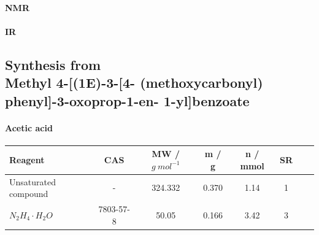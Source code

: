 \documentclass[../Master.tex]{subfiles}
\begin{document}
\paragraph{NMR}

\paragraph{IR}

\subsection{Synthesis from \\Methyl 4-[(1E)-3-[4- (methoxycarbonyl) phenyl]-3-oxoprop-1-en-
1-yl]benzoate}

\paragraph{Acetic acid}

\begin{center}
	\begin{tabular}[b]{lccccccc}
		\toprule
		Reagent               & CAS       & MW / \(g \ mol^{-1}\) & m / g & n / mmol & SR \\
		\midrule
		Unsaturated compound  & -         & 324.332               & 0.370 & 1.14     & 1  \\
		\(N_2H_4 \cdot H_2O\) & 7803-57-8 & 50.05                 & 0.166 & 3.42     & 3  \\
		\bottomrule
	\end{tabular}
\end{center}

\end{document}
